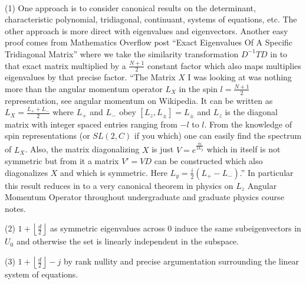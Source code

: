  \\
(1) One approach is to consider canonical results on the determinant, characteristic polynomial, tridiagonal, continuant, systems of equations, etc. The other approach is more direct with eigenvalues and eigenvectors. Another easy proof comes from Mathematics Overflow post ``Exact Eigenvalues Of A Specific Tridiagonal Matrix'' where we take the similarity transformation $D^{-1}TD$ in to that exact matrix multiplied by a $\frac{N+1}{2}$ constant factor which also maps multiplies eigenvalues by that precise factor. ``The Matrix $X$ I was looking at was nothing more than the angular momentum operator $L_X$ in the spin $l=\frac{N+1}{2}$ representation, see angular momentum on Wikipedia. It can be written as $L_X=\frac{L_{+}+L_{-}}{2}$ where $L_{+}$ and $L_{-}$ obey $[L_z,L_{\pm}]=L_{\pm}$ and $L_z$ is the diagonal matrix with integer spaced entries ranging from $-l$ to $l$. From the knowledge of spin representations (or $SL(2,C)$ if you which) one can easily find the spectrum of $L_X$. Also, the matrix diagonalizing $X$ is just $V=e^{\frac{\pi i}{2 L_y}}$ which in itself is not symmetric but from it a matrix $V'=VD$ can be constructed which also diagonalizes $X$ and which is symmetric. Here $L_y=\frac{i}{2}(L_{+}-L_{-})$.'' In particular this result reduces in to a very canonical theorem in physics on $L_z$ Angular Momentum Operator throughout undergraduate and graduate physics course notes.

(2) $\boxed{1+\left\lfloor \frac{d}{2} \right\rfloor}$ as symmetric eigenvalues across $0$ induce the same subeigenvectors in $U_0$ and otherwise the set is linearly independent in the subspace.

(3) $\boxed{1+\left\lfloor \frac{d}{2} \right\rfloor-j}$ by rank nullity and precise argumentation surrounding the linear system of equations.


